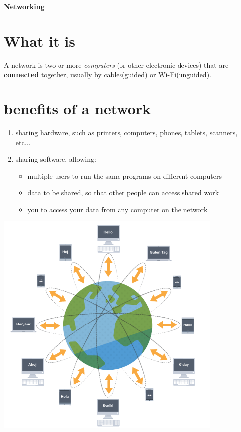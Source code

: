 \documentclass[a4paper,12pt]{article}
\begin{document}
\textbf{Networking}


\tableofcontents
\clearpage

\section{What it is}

A network is two or more \emph{computers} (or other electronic devices) that are \textbf{connected} together, usually by cables(guided) or Wi-Fi(unguided).

\section {benefits of a network}
\begin{enumerate}
\item {sharing hardware, such as printers, computers, phones, tablets, scanners, etc...}\footnotemark{}
\item {sharing software, allowing:}
    \begin{itemize}
    \item{multiple users to run the same programs on different computers}
    \item{data to be shared, so that other people can access shared work}
    \item{you to access your data from any computer on the network}
    \end{itemize}
\end{enumerate}

\includegraphics[width=11cm]{./net.png}
\end{document}
